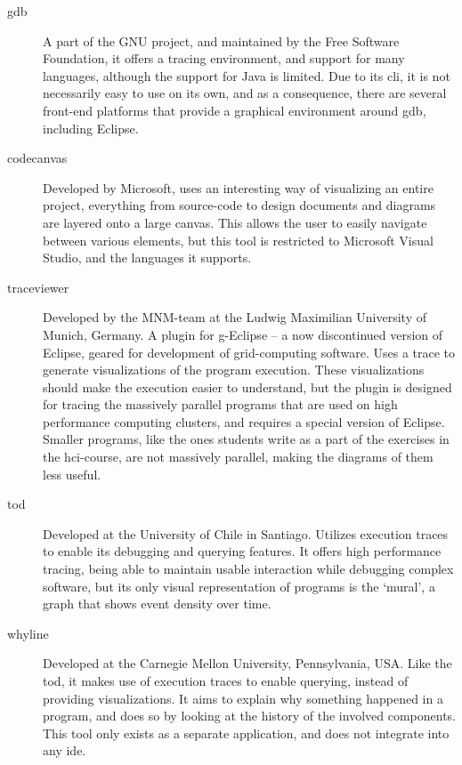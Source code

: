 \begin{description}
\item[\gls{gdb}] A part of the GNU project, and maintained by the Free Software Foundation, it offers a tracing environment, and support for many languages, although the support for Java is limited.
Due to its \gls{cli}, it is not necessarily easy to use on its own, and as a consequence, there are several front-end platforms that provide a graphical environment around \gls{gdb}, including Eclipse.

\item[\Gls{codecanvas}] \cite{Deline2010} Developed by Microsoft, uses an interesting way of visualizing an entire project, everything from source-code to design documents and diagrams are layered onto a large canvas.
This allows the user to easily navigate between various elements, but this tool is restricted to Microsoft Visual Studio, and the languages it supports.

\item[\gls{traceviewer}] \cite{Thomas2010} Developed by the MNM-team at the Ludwig Maximilian University of Munich, Germany.
A plugin for g-Eclipse -- a now discontinued version of Eclipse, geared for development of grid-computing software.
Uses a trace to generate visualizations of the program execution.
These visualizations should make the execution easier to understand, but the plugin is designed for tracing the massively parallel programs that are used on high performance computing clusters, and requires a special version of Eclipse.
Smaller programs, like the ones students write as a part of the exercises in the \gls{hci}-course, are not massively parallel, making the diagrams of them less useful.

\item[\gls{tod}] \cite{Pothier2007} Developed at the University of Chile in Santiago.
Utilizes execution traces to enable its debugging and querying features.
It offers high performance tracing, being able to maintain usable interaction while debugging complex software, but its only visual representation of programs is the `mural', a graph that shows event density over time.

\item[\Gls{whyline}] \cite{ko2009} Developed at the Carnegie Mellon University, Pennsylvania, USA.
Like the \gls{tod}, it makes use of execution traces to enable querying, instead of providing visualizations.
It aims to explain why something happened in a program, and does so by looking at the history of the involved components.
This tool only exists as a separate application, and does not integrate into any \gls{ide}.


\end{description}

